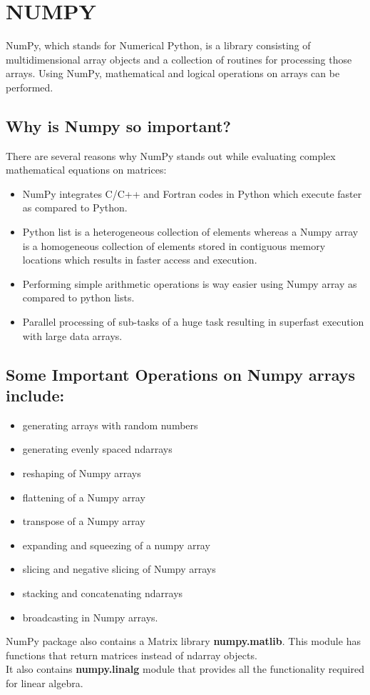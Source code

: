 \section*{NUMPY}

NumPy, which stands for Numerical Python, is a library consisting of multidimensional array objects and a collection of routines for processing those arrays. Using NumPy, mathematical and logical operations on arrays can be performed.

\subsection*{Why is Numpy so important?}
There are several reasons why NumPy stands out while evaluating complex mathematical equations on matrices:
\begin{itemize}
    \item NumPy integrates C/C++ and Fortran codes in Python which execute faster as compared to Python.
    \item Python list is a heterogeneous collection of elements whereas a Numpy array is a homogeneous collection of elements stored in contiguous memory locations which results in faster access and execution.
    \item Performing simple arithmetic operations is way easier using Numpy array as compared to python lists.
    \item Parallel processing of sub-tasks of a huge task resulting in superfast execution with large data arrays.
\end{itemize}

\subsection*{Some Important Operations on Numpy arrays include:}
\begin{itemize}
    \item generating arrays with random numbers
    \item generating evenly spaced ndarrays
    \item reshaping of Numpy arrays
    \item flattening of a Numpy array
    \item transpose of a Numpy array
    \item expanding and squeezing of a numpy array
    \item slicing and negative slicing of Numpy arrays
    \item stacking and concatenating ndarrays
    \item broadcasting in Numpy arrays.
\end{itemize}
NumPy package also contains a Matrix library \textbf{numpy.matlib}. This module has functions that return matrices instead of ndarray objects.\\
It also contains \textbf{numpy.linalg} module that provides all the functionality required for linear algebra.




